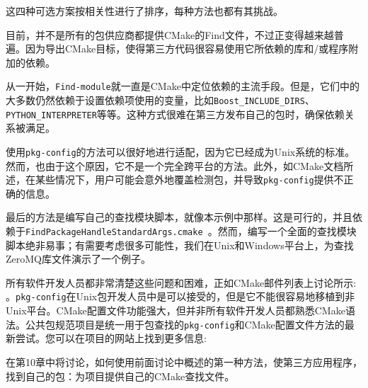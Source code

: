 这四种可选方案按相关性进行了排序，每种方法也都有其挑战。

目前，并不是所有的包供应商都提供CMake的Find文件，不过正变得越来越普遍。因为导出CMake目标，使得第三方代码很容易使用它所依赖的库和/或程序附加的依赖。

从一开始，\texttt{Find-module}就一直是CMake中定位依赖的主流手段。但是，它们中的大多数仍然依赖于设置依赖项使用的变量，比如\texttt{Boost\_INCLUDE\_DIRS}、\texttt{PYTHON\_INTERPRETER}等等。这种方式很难在第三方发布自己的包时，确保依赖关系被满足。

使用\texttt{pkg-config}的方法可以很好地进行适配，因为它已经成为Unix系统的标准。然而，也由于这个原因，它不是一个完全跨平台的方法。此外，如CMake文档所述，在某些情况下，用户可能会意外地覆盖检测包，并导致\texttt{pkg-config}提供不正确的信息。

最后的方法是编写自己的查找模块脚本，就像本示例中那样。这是可行的，并且依赖于\texttt{FindPackageHandleStandardArgs.cmake }。然而，编写一个全面的查找模块脚本绝非易事；有需要考虑很多可能性，我们在Unix和Windows平台上，为查找ZeroMQ库文件演示了一个例子。

所有软件开发人员都非常清楚这些问题和困难，正如CMake邮件列表上讨论所示:  。\texttt{pkg-config}在Unix包开发人员中是可以接受的，但是它不能很容易地移植到非Unix平台。CMake配置文件功能强大，但并非所有软件开发人员都熟悉CMake语法。公共包规范项目是统一用于包查找的\texttt{pkg-config}和CMake配置文件方法的最新尝试。您可以在项目的网站上找到更多信息: 

在第10章中将讨论，如何使用前面讨论中概述的第一种方法，使第三方应用程序，找到自己的包：为项目提供自己的CMake查找文件。


